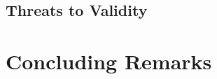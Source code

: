 \documentclass{sig-alternate}
\begin{document}
\linespread{0.95}
\subsection{Threats to Validity}\label{threats}
		
		
%	
\linespread{0.95}
\section{Concluding Remarks}\label{conclusion}
		

%	      
	
\linespread{0.98}
		

\end{document}
